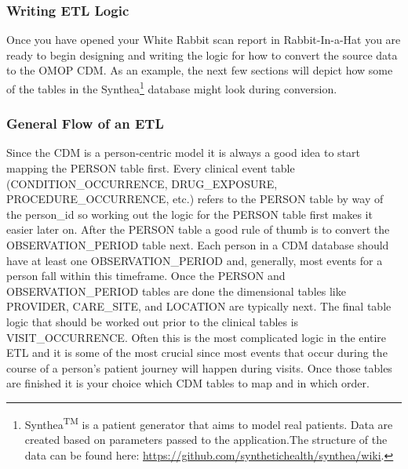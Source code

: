 \documentclass[11pt]{book}
\let\rmarkdownfootnote\footnote%
\def\footnote{\protect\rmarkdownfootnote}
\theoremstyle{definition}
\theoremstyle{definition}
\theoremstyle{definition}
\theoremstyle{remark}
\begin{document}
\hypertarget{writing-etl-logic}{%
\subsubsection*{Writing ETL Logic}\label{writing-etl-logic}}

Once you have opened your White Rabbit scan report in Rabbit-In-a-Hat you are ready to begin designing and writing the logic for how to convert the source data to the OMOP CDM. As an example, the next few sections will depict how some of the tables in the Synthea\footnote{Synthea\textsuperscript{TM} is a patient generator that aims to model real patients. Data are created based on parameters passed to the application.The structure of the data can be found here: \url{https://github.com/synthetichealth/synthea/wiki}.} database might look during conversion.

\hypertarget{general-flow-of-an-etl}{%
\subsubsection*{General Flow of an ETL}\label{general-flow-of-an-etl}}

Since the CDM is a person-centric model it is always a good idea to start mapping the PERSON table first. Every clinical event table (CONDITION\_OCCURRENCE, DRUG\_EXPOSURE, PROCEDURE\_OCCURRENCE, etc.) refers to the PERSON table by way of the person\_id so working out the logic for the PERSON table first makes it easier later on. After the PERSON table a good rule of thumb is to convert the OBSERVATION\_PERIOD table next. Each person in a CDM database should have at least one OBSERVATION\_PERIOD and, generally, most events for a person fall within this timeframe. Once the PERSON and OBSERVATION\_PERIOD tables are done the dimensional tables like PROVIDER, CARE\_SITE, and LOCATION are typically next. The final table logic that should be worked out prior to the clinical tables is VISIT\_OCCURRENCE. Often this is the most complicated logic in the entire ETL and it is some of the most crucial since most events that occur during the course of a person's patient journey will happen during visits. Once those tables are finished it is your choice which CDM tables to map and in which order.
\end{document}
